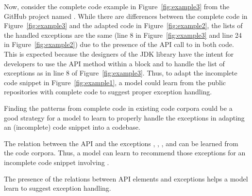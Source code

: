 






Now, consider the complete code example in Figure~\ref{fig:example3}
from the GitHub project named . While there are
differences between the complete code in Figure~\ref{fig:example3} and
the adapted code in Figure~\ref{fig:example2}, the lists of the handled
exceptions are the same (line 8 in Figure~\ref{fig:example3} and line
24 in Figure~\ref{fig:example2}) due to the presence of the API call
to  in both code. This is expected because
the designers of the JDK library have the intent for developers to use
the API method  within a 
block and to handle the list of exceptions as in line 8 of
Figure~\ref{fig:example3}. Thus, to adapt the incomplete code snippet
in Figure~\ref{fig:example1}, a model could learn from the public
repositories with complete code to suggest proper exception handling.

\begin{Observation} 
\label{ob2}
Finding the patterns from complete code in existing code corpora could
be a good strategy for a model to learn to properly handle the
  exceptions in adapting an (incomplete) code snippet into a
codebase.
\end{Observation}

The relation between the API 
and the exceptions ,
, , and
 can be learned from the code
corpora. Thus, a model can learn to recommend those exceptions for an
incomplete code snippet involving .

\begin{Observation} 
\label{ob3}
The presence of the relations between API elements and exceptions
helps a model learn to suggest exception handling.
\end{Observation}





